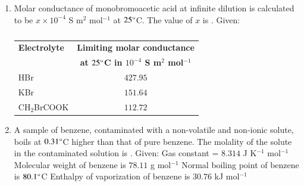 \documentclass[journal,12pt,onecolumn]{IEEEtran}
\theoremstyle{remark}
\begin{document}
\begin{enumerate}
    \hfill{}
    \begin{enumerate}
    \end{enumerate}

    \item Molar conductance of monobromoacetic acid at infinite dilution is calculated to be $x \times 10^{-4}$ S m$^2$ mol$^{-1}$ at $25\degree$C. The value of $x$ is .
    Given:
    \begin{table}[h!]
    \centering
    \caption*{}
    \label{tab:q18}
    \begin{tabular}{|l|c|}
    \hline
    \textbf{Electrolyte} & \textbf{Limiting molar conductance} \\
     & \textbf{at $25\degree$C in $10^{-4}$ S m$^2$ mol$^{-1}$} \\
    \hline
    HBr & $427.95$ \\
    KBr & $151.64$ \\
    CH$_2$BrCOOK & $112.72$ \\
    \hline
    \end{tabular}
    \end{table}

    \hfill{}
    \begin{enumerate}
    \end{enumerate}

    \item A sample of benzene, contaminated with a non-volatile and non-ionic solute, boils at $0.31\degree$C higher than that of pure benzene. The molality of the solute in the contaminated solution is \underline{\hspace{2cm}} .
    Given: Gas constant = $8.314$ J K$^{-1}$ mol$^{-1}$
    Molecular weight of benzene is $78.11$ g mol$^{-1}$
    Normal boiling point of benzene is $80.1\degree$C
    Enthalpy of vaporization of benzene is $30.76$ kJ mol$^{-1}$


\end{enumerate}
\end{document}
